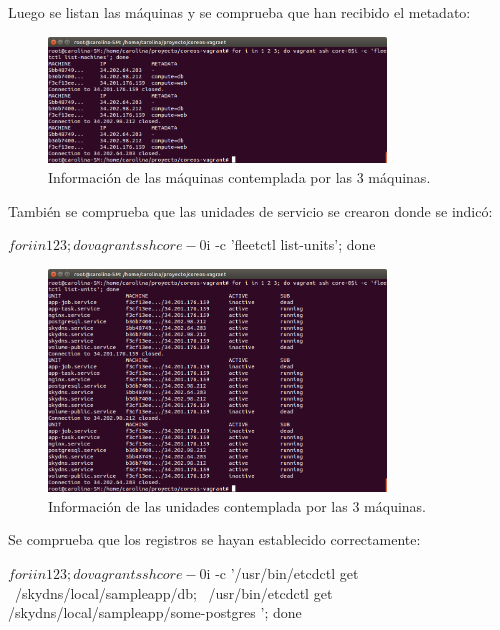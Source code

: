Luego se listan las máquinas y se comprueba que han recibido el metadato:


\begin{figure}[H]
\centering
\includegraphics[width=0.8\textwidth]{images/figures/skydns-machines.png}
\caption{Información de las máquinas contemplada por las 3 máquinas.}
\end{figure}

También se comprueba que las unidades de servicio se crearon donde se indicó:
\begin{code}
$ for i in 1 2 3; do vagrant ssh core-0$i -c 'fleetctl list-units'; done
\end{code}

\begin{figure}[H]
\centering
\includegraphics[width=0.8\textwidth]{images/figures/skydns-units.png}
\caption{Información de las unidades contemplada por las 3 máquinas.}
\end{figure}

Se comprueba que los registros se hayan establecido correctamente:

\begin{code}
$ for i in 1 2 3; do vagrant ssh core-0$i -c '/usr/bin/etcdctl get \
  /skydns/local/sampleapp/db; \
  /usr/bin/etcdctl get /skydns/local/sampleapp/some-postgres '; done
\end{code}

